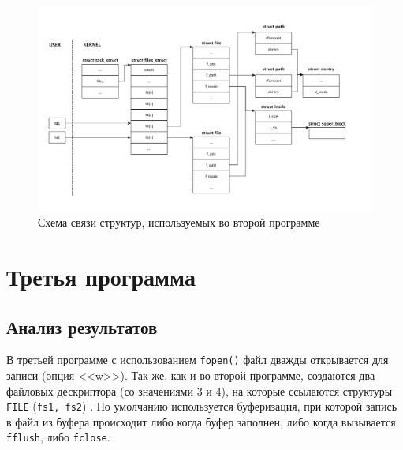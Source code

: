 \begin{figure}[ht]
	\centering
	\includegraphics[width=\textwidth]{img/22}
	\caption{Схема связи структур, используемых во второй программе}
\end{figure}\newpage

\section{Третья программа}

\captionsetup{singlelinecheck = false, justification=raggedright}


\clearpage

\captionsetup{singlelinecheck = false, justification=raggedright}


\clearpage

\captionsetup{singlelinecheck = false, justification=raggedright}


\clearpage

\captionsetup{singlelinecheck = false, justification=raggedright}


\subsection{Анализ результатов}

В третьей программе с использованием \texttt{fopen()} файл дважды открывается для записи (опция <<w>>). Так же, как и во второй программе,
создаются два файловых дескриптора (со значениями 3 и 4), на которые
ссылаются структуры \texttt{FILE} (\texttt{fs1, fs2}) . По умолчанию используется
буферизация, при которой запись в файл из буфера происходит либо когда буфер
заполнен, либо когда вызывается \texttt{fflush}, либо
\texttt{fclose}.


